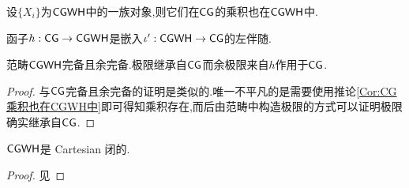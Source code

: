 \begin{corollary}\label{Cor:CG乘积也在CGWH中}
    设$\{X_i\}$为$\mathsf{CGWH}$中的一族对象,则它们在$\mathsf{CG}$的乘积也在$\mathsf{CGWH}$中.
\end{corollary}
\begin{proposition}
    函子$h : \mathsf{CG} \to \mathsf{CGWH}$是嵌入$\iota': \mathsf{CGWH}\to \mathsf{CG}$的左伴随.
\end{proposition}
\begin{theorem}\label{The:CGWH的完备性}
    范畴$\mathsf{CGWH}$完备且余完备.极限继承自$\mathsf{CG}$而余极限来自$h$作用于$\mathsf{CG}$.
\end{theorem}
\begin{proof}
    与$\mathsf{CG}$完备且余完备的证明是类似的.唯一不平凡的是需要使用推论\ref{Cor:CG乘积也在CGWH中}即可得知乘积存在,而后由范畴中构造极限的方式可以证明极限确实继承自$\mathsf{CG}$.
\end{proof}
\begin{proposition}
    $\mathsf{CGWH}$是 Cartesian 闭的.
\end{proposition}
\begin{proof}   
见\parencite[Proposition 2.12]{StricklandCGWH}
\end{proof}